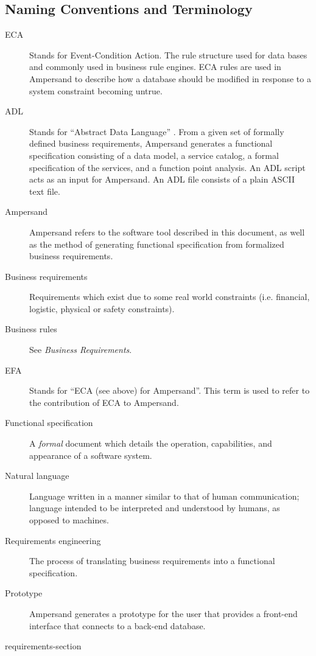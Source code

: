 \documentclass[journal,12pt,onecolumn,draftclsnofoot]{article}
\let\Oldsubsection\subsection
\renewcommand{\subsection}{\FloatBarrier\Oldsubsection}
\begin{document}
\subsection{Naming Conventions and Terminology}\label{sec:Naming} 
\begin{description}
    \item[ECA] Stands for Event-Condition Action. The rule structure used for 
    data
    bases and commonly used in  business rule engines. ECA rules are
    used in Ampersand to describe how a database should be modified in response 
    to
    a system constraint becoming untrue. 
    
    \item [ADL] Stands for ``Abstract Data Language''
      \cite[13]{derFun}.
    From a given set of formally defined business requirements, Ampersand generates a
    functional specification consisting of a data model, a service catalog, a
    formal specification of the services, and a function point analysis. An ADL
    script acts as an input for Ampersand. An ADL file consists of a plain ASCII
    text file.
    
    \item [Ampersand] Ampersand refers to the software tool described in this 
    document, as well as the method of generating functional specification from formalized
    business requirements. 
    
    \item [Business requirements] Requirements which exist due to some real 
    world 
    constraints (i.e. financial, logistic, physical or safety constraints). 
    
    \item [Business rules] See \emph{Business Requirements}.
    
    \item [EFA] Stands for ``ECA (see above) for Ampersand''. This term is used 
    to refer to the contribution of ECA to Ampersand. 
    
    \item [Functional specification] A \emph{formal} document which details the 
    operation,
    capabilities, and appearance of a software system. 
    
    \item [Natural language] Language written in a manner similar to that of 
    human 
    communication; language intended to be interpreted and understood by 
    humans, as 
    opposed to machines. 
    
    \item [Requirements engineering] The process of translating business
    requirements into a functional specification. 
    
    \item [Prototype] Ampersand generates a prototype for the user that 
    provides a 
    front-end interface that connects to a back-end database.
    
\end{description}

 {requirements-section}
\end{document}
